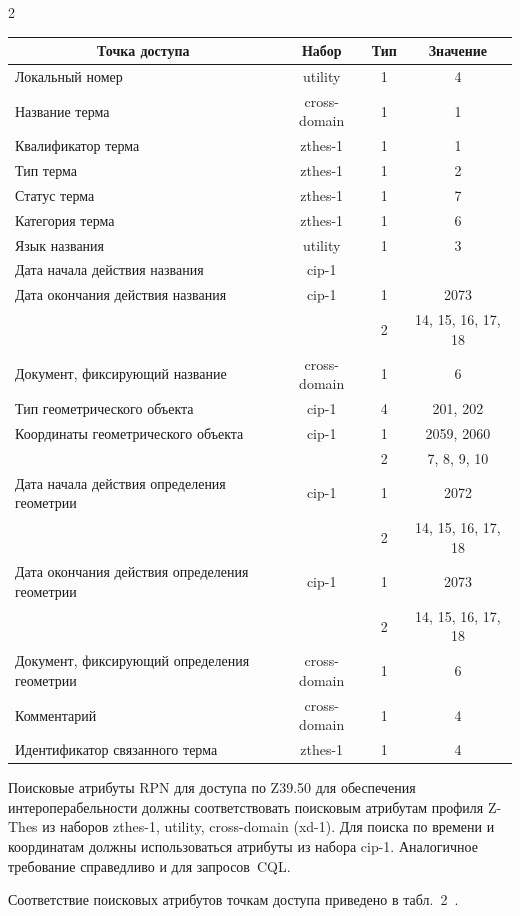 \begin{multicols}{2}
\begin{table}
\begin{center}
   \begin{tabular}{|l|c|c|c|}
   \hline
\multicolumn{1}{|c|}{Точка доступа}&Набор&Тип&Значение\\
\hline
Локальный номер&{utility}&1&4\\
Название терма&{cross-domain}&1&1\\
Квалификатор терма&{zthes-1}&1&1\\
Тип терма&{zthes-1}&1&2\\
Статус терма&{zthes-1}&1&7\\
Категория терма&{zthes-1}&1&6\\
Язык названия&{utility}&1&3\\
Дата начала действия названия&{cip-1}&&\\
Дата окончания действия названия&{cip-1}&1&2073\\
&&2&14, 15, 16, 17, 18\\
Документ, фиксирующий название&{cross-domain}&1&6\\
Тип геометрического объекта&{cip-1}&4&201, 202\\
Координаты геометрического объекта&{cip-1}&1&2059, 2060\\
&&2&7, 8, 9, 10\\
Дата начала действия определения геометрии&{cip-1}&1&2072\\
&&2&14, 15, 16, 17, 18\\
Дата окончания действия определения геометрии&{cip-1}&1&2073\\
&&2&14, 15, 16, 17, 18\\
Документ, фиксирующий определения геометрии&{cross-domain}&1&6\\
Комментарий&{cross-domain}&1&4\\
Идентификатор связанного терма&{zthes-1}&1&4\\
\hline
  \end{tabular}
  \end{center}
  \end{table}
  
  Поисковые атрибуты {RPN} для доступа по Z39.50 для обеспечения 
интероперабельности должны соответствовать поисковым атрибутам профиля \mbox{Z-Thes} 
из наборов {zthes-1}, {utility}, {cross-domain} (\mbox{xd-1}). Для поиска по 
времени и координатам должны использоваться атрибуты из набора {cip-1}. 
Аналогичное требование справедливо и для запросов~{CQL}.
  
  Соответствие поисковых атрибутов точкам доступа приведено в табл.~2~\cite{15-sk}.
  

\end{multicols}
